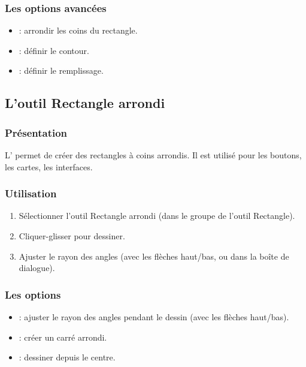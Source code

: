 \subsubsection{Les options avancées}

\begin{itemize}
    \item {} : arrondir les coins du rectangle.
    \item {} : définir le contour.
    \item {} : définir le remplissage.
\end{itemize}

\subsection{L'outil Rectangle arrondi}

\subsubsection{Présentation}

L' permet de créer des rectangles à coins arrondis. Il est utilisé pour les boutons, les cartes, les interfaces.

\subsubsection{Utilisation}

\begin{enumerate}
    \item Sélectionner l'outil Rectangle arrondi (dans le groupe de l'outil Rectangle).
    \item Cliquer-glisser pour dessiner.
    \item Ajuster le rayon des angles (avec les flèches haut/bas, ou dans la boîte de dialogue).
\end{enumerate}

\subsubsection{Les options}

\begin{itemize}
    \item {} : ajuster le rayon des angles pendant le dessin (avec les flèches haut/bas).
    \item {} : créer un carré arrondi.
    \item {} : dessiner depuis le centre.
\end{itemize}

